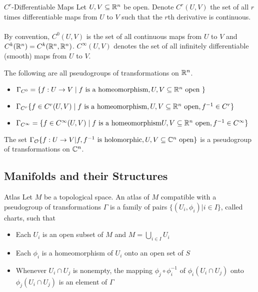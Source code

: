 \documentclass[a4paper]{article}
\begin{document}
\begin{defn}{$C^r$-Differentiable Maps}{} Let $U,V\subseteq\mathbb{R}^n$ be open. Denote $C^r(U,V)$ the set of all $r$ times differentiable maps from $U$ to $V$ such that the $r$th derivative is continuous. \\~\\
By convention, $C^0(U,V)$ is the set of all continuous maps from $U$ to $V$ and $C^k(\mathbb{R}^n)=C^k(\mathbb{R}^n,\mathbb{R}^n)$. $C^\infty(U,V)$ denotes the set of all infinitely differentiable (smooth) maps from $U$ to $V$. 
\end{defn}

\begin{prp}{}{} The following are all pseudogroups of transformations on $\mathbb{R}^n$. 
\begin{itemize}
\item $\Gamma_{C^0}=\{f:U\to V\;|\;f\text{ is a homeomorphism}, U,V\subseteq\mathbb{R}^n\text{ open }\}$
\item $\Gamma_{C^r}\{f\in C^r(U,V)\;|\;f\text{ is a homeomorphism}, U,V\subseteq\mathbb{R}^n\text{ open}, f^{-1}\in C^r\}$
\item $\Gamma_{C^\infty}=\{f\in C^\infty(U,V)\;|\;f\text{ is a homeomorphism}U,V\subseteq\mathbb{R}^n\text{ open},f^{-1}\in C^\infty\}$
\end{itemize}
\end{prp}

\begin{prp}{}{} The set $\Gamma_{\mathcal{O}}\{f:U\to V|f,f^{-1}\text{ is holomorphic}, U,V\subseteq\mathbb{C}^n\text{ open}\}$ is a pseudogroup of transformations on $\mathbb{C}^n$. 
\end{prp}

\subsection{Manifolds and their Structures}
\begin{defn}{Atlas}{} Let $M$ be a topological space. An atlas of $M$ compatible with a pseudogroup of transformations $\Gamma$ is a family of pairs $\{(U_i,\phi_i)|i\in I\}$, called charts, such that 
\begin{itemize}
\item Each $U_i$ is an open subset of $M$ and $M=\bigcup_{i\in I}U_i$
\item Each $\phi_i$ is a homeomorphism of $U_i$ onto an open set of $S$
\item Whenever $U_i\cap U_j$ is nonempty, the mapping $\phi_j\circ\phi_i^{-1}$ of $\phi_i(U_i\cap U_j)$ onto $\phi_j(U_i\cap U_j)$ is an element of $\Gamma$
\end{itemize}
\end{defn}
\end{document}
